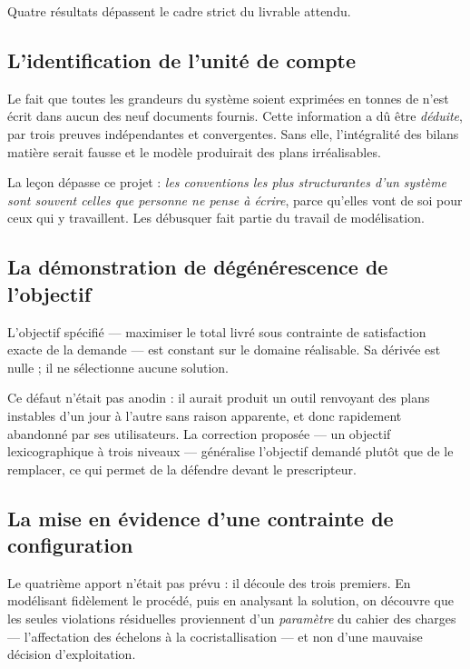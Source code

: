 Quatre résultats dépassent le cadre strict du livrable attendu.

\subsection{L'identification de l'unité de compte}

Le fait que toutes les grandeurs du système soient exprimées en tonnes de \PdeuxOcinq{}
n'est écrit dans aucun des neuf documents fournis. Cette information a dû être
\emph{déduite}, par trois preuves indépendantes et convergentes. Sans elle, l'intégralité
des bilans matière serait fausse et le modèle produirait des plans irréalisables.

\begin{encadre}
La leçon dépasse ce projet : \emph{les conventions les plus structurantes d'un système sont
souvent celles que personne ne pense à écrire}, parce qu'elles vont de soi pour ceux qui y
travaillent. Les débusquer fait partie du travail de modélisation.
\end{encadre}

\subsection{La démonstration de dégénérescence de l'objectif}

L'objectif spécifié --- maximiser le total livré sous contrainte de satisfaction exacte de
la demande --- est constant sur le domaine réalisable. Sa dérivée est nulle ; il ne sélectionne
aucune solution.

Ce défaut n'était pas anodin : il aurait produit un outil renvoyant des plans instables d'un
jour à l'autre sans raison apparente, et donc rapidement abandonné par ses utilisateurs. La
correction proposée --- un objectif lexicographique à trois niveaux --- généralise l'objectif
demandé plutôt que de le remplacer, ce qui permet de la défendre devant le prescripteur.

\subsection{La mise en évidence d'une contrainte de configuration}

Le quatrième apport n'était pas prévu : il découle des trois premiers. En modélisant
fidèlement le procédé, puis en analysant la solution, on découvre que les seules violations
résiduelles proviennent d'un \emph{paramètre} du cahier des charges --- l'affectation des
échelons à la cocristallisation --- et non d'une mauvaise décision d'exploitation.

